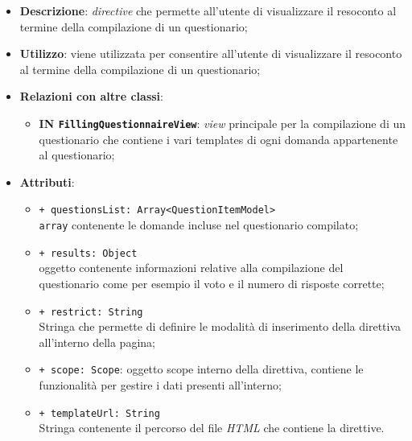 		\begin{itemize}
			\item \textbf{Descrizione}: \textit{directive} che permette all'utente di visualizzare il resoconto al termine della compilazione di un questionario;
			\item \textbf{Utilizzo}: viene utilizzata per consentire all'utente di visualizzare il resoconto al termine della compilazione di un questionario;
			\item \textbf{Relazioni con altre classi}: 
			\begin{itemize}
				\item \textbf{IN \texttt{FillingQuestionnaireView}}: \textit{view} principale per la compilazione di un questionario che contiene i vari templates di ogni domanda appartenente al questionario;
			\end{itemize}
			\item \textbf{Attributi}:
			\begin{itemize}
				\item \texttt{+ questionsList: Array<QuestionItemModel>} \\ \texttt{array} contenente le domande incluse nel questionario compilato;
				\item \texttt{+ results: Object} \\ oggetto contenente informazioni relative alla compilazione del questionario come per esempio il voto e il numero di risposte corrette; 
		\item \texttt{+ restrict: String} \\ Stringa che permette di definire le modalità di inserimento della direttiva all'interno della pagina;
		\item \texttt{+ scope: Scope}: oggetto scope interno della direttiva, contiene le funzionalità per gestire i dati presenti all'interno;
		\item \texttt{+ templateUrl: String} \\ Stringa contenente il percorso del file \textit{HTML} che contiene la direttive.
			\end{itemize}
		\end{itemize}